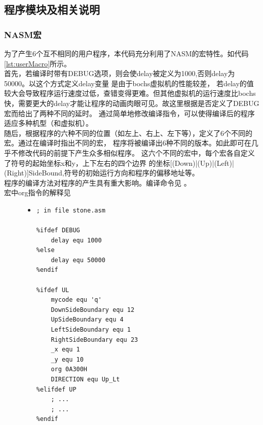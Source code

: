 \documentclass[a4paper]{article}
\newcommand{\codev}[1]{\textsf{#1}}
\begin{document}
    
    \subsection{程序模块及相关说明}\label{subsec:modelIntroduction}
    \subsubsection{NASM宏} \label{subsec:NASMmacro}
    为了产生6个互不相同的用户程序，本代码充分利用了NASM的宏特性。如代码\ref{lst:userMacro}所示。\\
    
    首先，若编译时带有\codev{DEBUG}选项，则会使delay被定义为1000,否则delay为50000。以这个方式定义delay变量
    是由于bochs虚拟机的性能较差，
    若delay的值较大会导致程序运行速度过低，查错变得更难。但其他虚拟机的运行速度比bochs
    快，需要更大的delay才能让程序的动画肉眼可见。故这里根据是否定义了\codev{DEBUG}宏而给出了两种不同的延时。
    通过简单地修改编译指令，可以使得编译后的程序适应多种机型（和虚拟机）。\\
    
    随后，根据程序的六种不同的位置（如左上、右上、左下等），定义了6个不同的宏。通过在编译时指出不同的宏，
    程序将被编译出6种不同的版本。如此即可在几乎不修改代码的前提下产生众多相似程序。
    这六个不同的宏中，每个宏各自定义了符号的起始坐标\codev{x}和\codev{y}，上下左右的四个边界
    的坐标\codev{[(Down)|(Up)|(Left)|(Right)]SideBound},符号的初始运行方向和程序的偏移地址等。\\
    

    程序的编译方法对程序的产生具有重大影响。编译命令见%
    。\\
    
    宏中\codev{org}指令的解释见%
    
    \begin{figure}
    \begin{itemize}
    \item[] \begin{lstlisting}[language={[x86masm]Assembler}, label=lst:userMacro, caption=用户程序中的部分宏代码]
; in file stone.asm 

%ifdef DEBUG
    delay equ 1000
%else
    delay equ 50000
%endif

%ifdef UL
    mycode equ 'q'
    DownSideBoundary equ 12
    UpSideBoundary equ 4
    LeftSideBoundary equ 1
    RightSideBoundary equ 23
    _x equ 1
    _y equ 10
    org 0A300H
    DIRECTION equ Up_Lt
%elifdef UP
    ; ...
    ; ...
%endif
    \end{lstlisting}
    \end{itemize}
    \end{figure}
   
\end{document}
